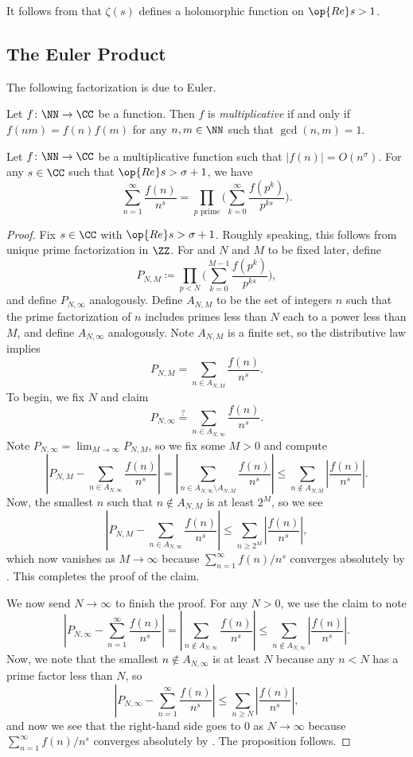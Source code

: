 \documentclass[../notes.tex]{subfiles}
\begin{document}
It follows from  that $\zeta(s)$ defines a holomorphic function on $\op{Re}s>1$.

\subsection{The Euler Product}
The following factorization is due to Euler.
\begin{definition}[multiplicative]
	Let $f\colon\NN\to\CC$ be a function. Then $f$ is \textit{multiplicative} if and only if $f(nm)=f(n)f(m)$ for any $n,m\in\NN$ such that $\gcd(n,m)=1$.
\end{definition}
\begin{proposition} \label{prop:euler-factor}
	Let $f\colon\NN\to\CC$ be a multiplicative function such that $|f(n)|=O\left(n^\sigma\right)$. For any $s\in\CC$ such that $\op{Re}s>\sigma+1$, we have
	\[\sum_{n=1}^\infty\frac{f(n)}{n^s}=\prod_{p\text{ prime}}\Bigg(\sum_{k=0}^\infty\frac{f\left(p^k\right)}{p^{ks}}\Bigg).\]
\end{proposition}
\begin{proof}
	Fix $s\in\CC$ with $\op{Re}s>\sigma+1$. Roughly speaking, this follows from unique prime factorization in $\ZZ$. For and $N$ and $M$ to be fixed later, define
	\[P_{N,M}\coloneqq\prod_{p<N}\Bigg(\sum_{k=0}^{M-1}\frac{f\left(p^k\right)}{p^{ks}}\Bigg),\]
	and define $P_{N,\infty}$ analogously. Define $A_{N,M}$ to be the set of integers $n$ such that the prime factorization of $n$ includes primes less than $N$ each to a power less than $M$, and define $A_{N,\infty}$ analogously. Note $A_{N,M}$ is a finite set, so the distributive law implies
	\[P_{N,M}=\sum_{n\in A_{N,M}}\frac{f(n)}{n^s}.\]
	To begin, we fix $N$ and claim
	\[P_{N,\infty}\stackrel?=\sum_{n\in A_{N,\infty}}\frac{f(n)}{n^s}.\]
	Note $P_{N,\infty}=\lim_{M\to\infty}P_{N,M}$, so we fix some $M>0$ and compute
	\[\left|P_{N,M}-\sum_{n\in A_{N,\infty}}\frac{f(n)}{n^s}\right|=\left|\sum_{n\in A_{N,\infty}\setminus A_{N,M}}\frac{f(n)}{n^s}\right|\le\sum_{n\notin A_{N,M}}\left|\frac{f(n)}{n^s}\right|.\]
	Now, the smallest $n$ such that $n\notin A_{N,M}$ is at least $2^M$, so we see
	\[\left|P_{N,M}-\sum_{n\in A_{N,\infty}}\frac{f(n)}{n^s}\right|\le\sum_{n\ge 2^M}\left|\frac{f(n)}{n^s}\right|,\]
	which now vanishes as $M\to\infty$ because $\sum_{n=1}^\infty f(n)/n^s$ converges absolutely by . This completes the proof of the claim.

	We now send $N\to\infty$ to finish the proof. For any $N>0$, we use the claim to note
	\[\left|P_{N,\infty}-\sum_{n=1}^\infty\frac{f(n)}{n^s}\right|=\left|\sum_{n\notin A_{N,\infty}}\frac{f(n)}{n^s}\right|\le\sum_{n\notin A_{N,\infty}}\left|\frac{f(n)}{n^s}\right|.\]
	Now, we note that the smallest $n\notin A_{N,\infty}$ is at least $N$ because any $n<N$ has a prime factor less than $N$, so
	\[\left|P_{N,\infty}-\sum_{n=1}^\infty\frac{f(n)}{n^s}\right|\le\sum_{n\ge N}\left|\frac{f(n)}{n^s}\right|,\]
	and now we see that the right-hand side goes to $0$ as $N\to\infty$ because $\sum_{n=1}^\infty f(n)/n^s$ converges absolutely by . The proposition follows.
\end{proof}
\end{document}
